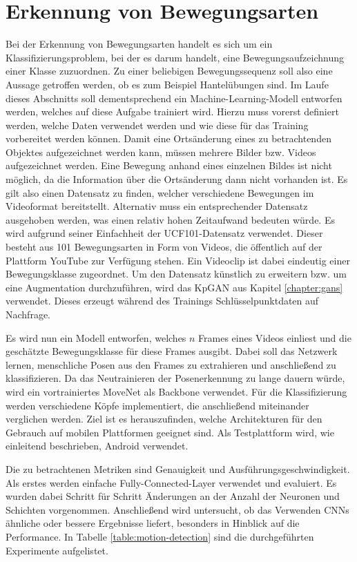 \section{Erkennung von Bewegungsarten}
Bei der Erkennung von Bewegungsarten handelt es sich um ein
Klassifizierungsproblem, bei der es darum handelt, eine Bewegungsaufzeichnung
einer Klasse zuzuordnen. Zu einer beliebigen Bewegungssequenz soll also eine
Aussage getroffen werden, ob es zum Beispiel Hantelübungen sind. Im Laufe dieses
Abschnitts soll dementsprechend ein Machine-Learning-Modell entworfen werden,
welches auf diese Aufgabe trainiert wird. Hierzu muss vorerst definiert werden,
welche Daten verwendet werden und wie diese für das Training vorbereitet werden
können. Damit eine Ortsänderung eines zu betrachtenden Objektes aufgezeichnet
werden kann, müssen mehrere Bilder bzw. Videos aufgezeichnet werden. Eine
Bewegung anhand eines einzelnen Bildes ist nicht möglich, da die Information
über die Ortsänderung dann nicht vorhanden ist. Es gilt also einen Datensatz zu
finden, welcher verschiedene Bewegungen im Videoformat bereitstellt. Alternativ
muss ein entsprechender Datensatz ausgehoben werden, was einen relativ hohen
Zeitaufwand bedeuten würde. Es wird aufgrund seiner Einfachheit der
UCF101-Datensatz \cite{ucf101} verwendet. Dieser besteht aus 101 Bewegungsarten
in Form von Videos, die öffentlich auf der Plattform YouTube zur Verfügung
stehen. Ein Videoclip ist dabei eindeutig einer Bewegungsklasse zugeordnet. Um
den Datensatz künstlich zu erweitern bzw. um eine Augmentation durchzuführen,
wird das KpGAN aus Kapitel \ref{chapter:gans} verwendet. Dieses erzeugt während des Trainings Schlüsselpunktdaten auf Nachfrage.

Es wird nun ein Modell entworfen, welches $n$ Frames eines Videos einliest und
die geschätzte Bewegungsklasse für diese Frames ausgibt. Dabei soll das Netzwerk
lernen, menschliche Posen aus den Frames zu extrahieren und anschließend zu
klassifizieren. Da das Neutrainieren der Posenerkennung zu lange dauern würde,
wird ein vortrainiertes MoveNet als Backbone verwendet. Für die Klassifizierung
werden verschiedene Köpfe implementiert, die anschließend miteinander verglichen
werden. Ziel ist es herauszufinden, welche Architekturen für den Gebrauch auf
mobilen Plattformen geeignet sind. Als Testplattform wird, wie einleitend beschrieben, Android verwendet.

Die zu betrachtenen Metriken sind Genauigkeit und
Aus\-führ\-ungs\-ge\-schwin\-dig\-keit. Als erstes werden einfache
Fully-Connected-Layer verwendet und evaluiert. Es wurden dabei Schritt für
Schritt Änderungen an der Anzahl der Neuronen und Schichten vorgenommen.
Anschließend wird untersucht, ob das Verwenden CNNs ähnliche oder bessere
Ergebnisse liefert, besonders in Hinblick auf die Performance. In Tabelle
\ref{table:motion-detection} sind die durchgeführten Experimente aufgelistet.

